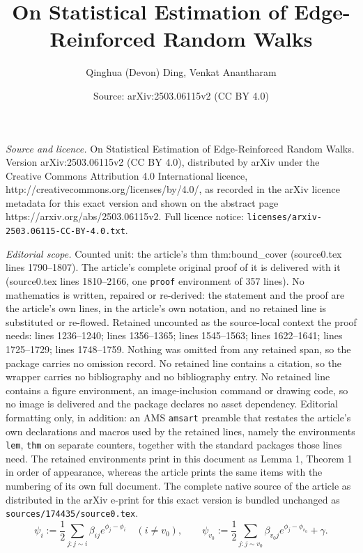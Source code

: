 \documentclass[10pt,a4paper]{amsart}
\title{On Statistical Estimation of Edge-Reinforced Random Walks}
\author{Qinghua (Devon) Ding, Venkat Anantharam}
\date{Source: arXiv:2503.06115v2 (CC BY 4.0)}
\begin{document}
\maketitle

\noindent\emph{Source and licence.} On Statistical Estimation of Edge-Reinforced Random Walks. Version arXiv:2503.06115v2 (CC BY 4.0), distributed by arXiv under the Creative Commons Attribution 4.0 International licence, http://creativecommons.org/licenses/by/4.0/, as recorded in the arXiv licence metadata for this exact version and shown on the abstract page https://arxiv.org/abs/2503.06115v2. Full licence notice: \texttt{licenses/arxiv-2503.06115-CC-BY-4.0.txt}.\par\smallskip

\noindent\textit{Editorial scope.} Counted unit: the article's thm thm:bound\_cover (source0.tex lines 1790--1807). The article's complete original proof of it is delivered with it (source0.tex lines 1810--2166, one \texttt{proof} environment of 357 lines). No mathematics is written, repaired or re-derived: the statement and the proof are the article's own lines, in the article's own notation, and no retained line is substituted or re-flowed.  Retained uncounted as the source-local context the proof needs: lines 1236--1240; lines 1356--1365; lines 1545--1563; lines 1622--1641; lines 1725--1729; lines 1748--1759.  Nothing was omitted from any retained span, so the package carries no omission record.  No retained line contains a citation, so the wrapper carries no bibliography and no bibliography entry.  No retained line contains a figure environment, an image-inclusion command or drawing code, so no image is delivered and the package declares no asset dependency.  Editorial formatting only, in addition: an AMS \texttt{amsart} preamble that restates the article's own declarations and macros used by the retained lines, namely the environments \texttt{lem}, \texttt{thm} on separate counters, together with the standard packages those lines need.  The retained environments print in this document as Lemma 1, Theorem 1 in order of appearance, whereas the article prints the same items with the numbering of its own full document.  The complete native source of the article as distributed in the arXiv e-print for this exact version is bundled unchanged as \texttt{sources/174435/source0.tex}.
\begin{equation}\label{eqn:psi}
\psi_{i}:=\frac12\sum_{j:j\sim i}\beta_{ij}e^{\phi_j-\phi_i}\quad (i\neq v_0),
\qquad
\psi_{v_0}:=\frac12\sum_{j:j\sim v_0}\beta_{v_0j}e^{\phi_j-\phi_{v_0}}+\gamma.
\end{equation}
\end{document}
